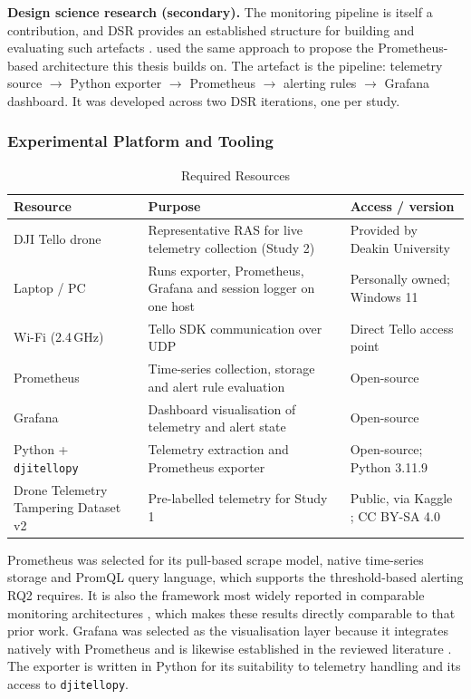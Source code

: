 \noindent\textbf{Design science research (secondary).} The monitoring pipeline is
itself a contribution, and DSR provides an established structure for building and
evaluating such artefacts \citep{hevner2004}. \citet{boncea2016} used the same
approach to propose the Prometheus-based architecture this thesis builds on. The
artefact is the pipeline: telemetry source $\rightarrow$ Python exporter
$\rightarrow$ Prometheus $\rightarrow$ alerting rules $\rightarrow$ Grafana
dashboard. It was developed across two DSR iterations, one per study.

\subsubsection{Experimental Platform and Tooling}

\begin{table}[htbp]
\centering
\caption{Required Resources}
\label{tab:resources}
\small
\begin{tabular}{|>{\raggedright\arraybackslash}p{3.5cm}|p{6cm}|p{4.3cm}|}
\hline
\textbf{Resource} & \textbf{Purpose} & \textbf{Access / version} \\
\hline
DJI Tello drone & Representative RAS for live telemetry collection (Study 2) & Provided by Deakin University \\
\hline
Laptop / PC & Runs exporter, Prometheus, Grafana and session logger on one host & Personally owned; Windows 11 \\
\hline
Wi-Fi (2.4\,GHz) & Tello SDK communication over UDP & Direct Tello access point \\
\hline
Prometheus & Time-series collection, storage and alert rule evaluation & Open-source \\
\hline
Grafana & Dashboard visualisation of telemetry and alert state & Open-source \\
\hline
Python + \texttt{djitellopy} & Telemetry extraction and Prometheus exporter & Open-source; Python 3.11.9 \\
\hline
Drone Telemetry Tampering Dataset v2 & Pre-labelled telemetry for Study 1 & Public, via Kaggle \citep{ekanayakadevlk2024}; CC BY-SA 4.0 \\
\hline
\end{tabular}
\end{table}

Prometheus was selected for its pull-based scrape model, native time-series
storage and PromQL query language, which supports the threshold-based alerting
RQ2 requires. It is also the framework most widely reported in comparable
monitoring architectures \citep{boncea2016}, which makes these results directly
comparable to that prior work. Grafana was selected as the visualisation layer
because it integrates natively with Prometheus and is likewise established in the
reviewed literature \citep{benhafaiedh2022}. The exporter is written in Python
for its suitability to telemetry handling and its access to \texttt{djitellopy}.

